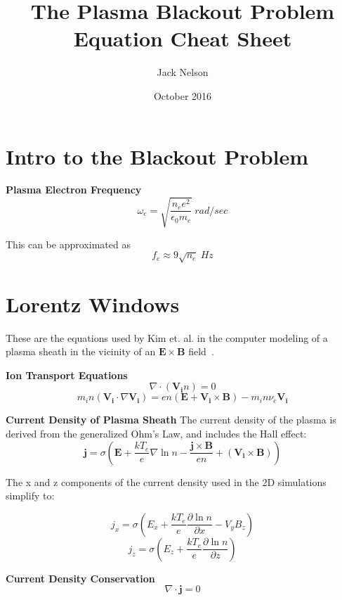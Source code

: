 \documentclass[]{tufte-handout}
\title{The Plasma Blackout Problem Equation Cheat Sheet}
\author{Jack Nelson}
\date{October 2016}
\begin{document}
\maketitle


\section{Intro to the Blackout Problem}
\textbf{Plasma Electron Frequency}
\begin{equation}
	\omega_e = \sqrt{\frac{n_e e^2}{\epsilon_0 m_e}} \ rad/sec
\end{equation}

This can be approximated as
\begin{equation}
	f_e \approx 9\sqrt{n_e} \ Hz
\end{equation}

\section{Lorentz Windows}
These are the equations used by Kim et. al. in the computer modeling of a plasma sheath in the vicinity of an $\mathbf{E}\times\mathbf{B}$ field~\cite{kim_analysis_2008}.

\textbf{Ion Transport Equations}
\begin{equation}
	\nabla \cdot (\mathbf{V_i} n) = 0
\end{equation}
\begin{equation}
	m_{ i }n(\mathbf { V_{ i } } \cdot \nabla \mathbf { V_{ i } } )=en(\mathbf { E } +\mathbf { V_{ i } } \times \mathbf { B } )-m_{ i }n\nu _{ c }\mathbf { V_{ i } }
\end{equation}

\textbf{Current Density of Plasma Sheath}
The current density of the plasma is derived from the generalized Ohm's Law, and includes the Hall effect:
\begin{equation}
	\mathbf{j} = \sigma \left(\mathbf{E} + \frac{kT_e}{e}\nabla \ln n - \frac{\mathbf{j} \times \mathbf{B}}{en} + \left(\mathbf{V_i} \times \mathbf{B}\right)\right)
\end{equation}

The x and z components of the current density used in the 2D simulations simplify to:

\begin{equation}
	j_x = \sigma \left(E_x + \frac{kT_e}{e} \frac{\partial \ln n}{\partial x} - V_yB_z\right)
\end{equation}
\begin{equation}
	j_z =\sigma \left(E_z + \frac{kT_e}{e}\frac{\partial\ln n}{\partial z}\right) 
\end{equation}

\textbf{Current Density Conservation}
\begin{equation}
\nabla \cdot \mathbf{j} = 0
\end{equation}



\end{document}
